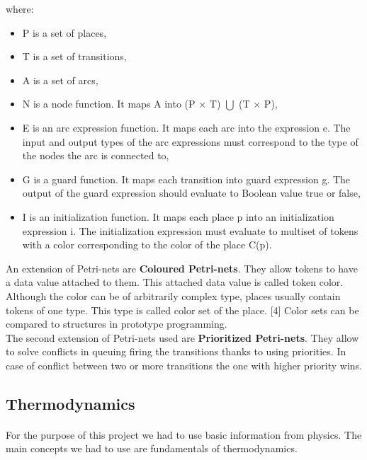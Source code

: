 \documentclass[a4paper]{article}
\begin{document}
where:
\begin{itemize}
	\setlength{\itemsep}{1pt}
	\setlength{\parskip}{0pt}
	\setlength{\parsep}{0pt}
\item P is a set of places,
\item T is a set of transitions,
\item A is a set of arcs,
\item N is a node function. It maps A into (P $\times$ T) $\bigcup$ (T $\times$ P),
\item E is an arc expression function. It maps each arc into the expression e. The input and output types of the arc expressions must correspond to the type of the nodes the arc is connected to,
\item G is a guard function. It maps each transition into guard expression g. The output of the guard expression should evaluate to Boolean value true or false,
\item I is an initialization function. It maps each place p into an initialization expression i. The initialization expression must evaluate to multiset of tokens with a color corresponding to the color of the place C(p).\\
\end{itemize}

\clearpage

An extension of Petri-nets are \textbf{Coloured Petri-nets}. They allow tokens to have a data value attached to them. This attached data value is called token color. Although the color can be of arbitrarily complex type, places usually contain tokens of one type. This type is called color set of the place. [4] Color sets can be compared to structures in prototype programming.\\

The second extension of Petri-nets used are \textbf{Prioritized Petri-nets}. They allow to solve conflicts in queuing firing the transitions thanks to using priorities. In case of conflict between two or more transitions the one with higher priority wins.

\subsection{Thermodynamics}
\label{sec:thermodynamics}
\paragraph{}

For the purpose of this project we had to use basic information from physics. The main concepts we had to use are fundamentals of thermodynamics.\\
\end{document}
